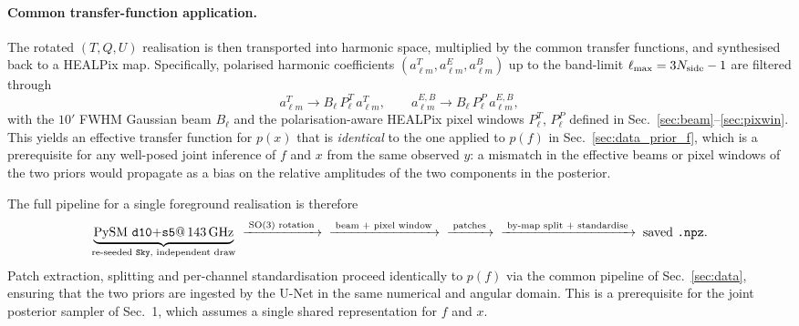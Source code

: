 \documentclass[11pt]{article}
\theoremstyle{definition}
\begin{document}
\paragraph{Common transfer-function application.}
The rotated $(T,Q,U)$ realisation is then transported into harmonic space, multiplied by the common transfer functions, and synthesised back to a HEALPix map. Specifically, polarised harmonic coefficients $(a^T_{\ell m},a^E_{\ell m},a^B_{\ell m})$ up to the band-limit $\ell_{\max}=3N_{\rm side}-1$ are filtered through
\begin{equation}
  a_{\ell m}^T\to B_\ell\,P_\ell^{T}\,a_{\ell m}^T,
  \qquad
  a_{\ell m}^{E,B}\to B_\ell\,P_\ell^{P}\,a_{\ell m}^{E,B},
\end{equation}
with the $10'$ FWHM Gaussian beam $B_\ell$ and the polarisation-aware HEALPix pixel windows $P_\ell^{T}$, $P_\ell^{P}$ defined in Sec.~\ref{sec:beam}--\ref{sec:pixwin}. This yields an effective transfer function for $p(x)$ that is \emph{identical} to the one applied to $p(f)$ in Sec.~\ref{sec:data_prior_f}, which is a prerequisite for any well-posed joint inference of $f$ and $x$ from the same observed $y$: a mismatch in the effective beams or pixel windows of the two priors would propagate as a bias on the relative amplitudes of the two components in the posterior.

The full pipeline for a single foreground realisation is therefore
\begin{equation}
  \underbrace{\text{PySM \texttt{d10}+\texttt{s5}@}\,143\,\mathrm{GHz}}_{\text{re-seeded \texttt{Sky}, independent draw}}
  \;\xrightarrow{\;\text{SO(3) rotation}\;}\;
  \;\xrightarrow{\;\text{beam + pixel window}\;}\;
  \;\xrightarrow{\;\text{patches}\;}\;
  \;\xrightarrow{\;\text{by-map split + standardise}\;}\;
  \text{saved \texttt{.npz}.}
\end{equation}
Patch extraction, splitting and per-channel standardisation proceed identically to $p(f)$ via the common pipeline of Sec.~\ref{sec:data}, ensuring that the two priors are ingested by the U-Net in the same numerical and angular domain. This is a prerequisite for the joint posterior sampler of Sec.~1, which assumes a single shared representation for $f$ and $x$.
\end{document}
